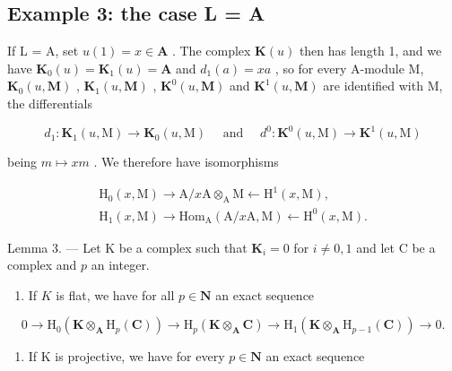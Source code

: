 \subsection{Example 3: the case L = A}

If L = A, set \(u(1) = x \in \mathbf{A}\) . The complex \(\mathbf{K}(u)\) then has length 1, and we have \(\mathbf{K}_{0}(u) = \mathbf{K}_{1}(u) = \mathbf{A}\) and \(d_{1}(a) = xa\) , so for every A-module M, \(\mathbf{K}_{0}(u, \mathbf{M})\) , \(\mathbf{K}_{1}(u, \mathbf{M})\) , \(\mathbf{K}^{0}(u, \mathbf{M})\) and \(\mathbf{K}^{1}(u, \mathbf{M})\) are identified with M, the differentials

\[
d _ {1}: \mathbf {K} _ {1} (u, \mathrm{M}) \rightarrow \mathbf {K} _ {0} (u, \mathrm{M}) \quad \text { and }\quad d ^ {0}: \mathbf {K} ^ {0} (u, \mathrm{M}) \rightarrow \mathbf {K} ^ {1} (u, \mathrm{M})
\]

being \(m \mapsto xm\) . We therefore have isomorphisms

\[
\begin{array}{l} \mathrm{H} _ {0} (x, \mathrm{M}) \to \mathrm{A} / x \mathrm{A} \otimes_ {\mathrm{A}} \mathrm{M} \leftarrow \mathrm{H} ^ {1} (x, \mathrm{M}), \\ \mathrm{H} _ {1} (x, \mathrm{M}) \to \mathrm{Hom} _ {\mathrm{A}} (\mathrm{A} / x \mathrm{A}, \mathrm{M}) \leftarrow \mathrm{H} ^ {0} (x, \mathrm{M}). \end{array}
\]

Lemma 3. --- Let K be a complex such that \(\mathbf{K}_i = 0\) for \(i \neq 0, 1\) and let C be a complex and \(p\) an integer.

\begin{enumerate}
\def\labelenumi{\alph{enumi})}
\tightlist
\item
  If \(K\) is flat, we have for all \(p \in \mathbf{N}\) an exact sequence
\end{enumerate}

\[
0 \rightarrow \mathrm{H} _ {0} (\mathbf {K} \otimes_ {\mathbf {A}} \mathrm{H} _ {p} (\mathbf {C})) \rightarrow \mathrm{H} _ {p} (\mathbf {K} \otimes_ {\mathbf {A}} \mathbf {C}) \rightarrow \mathrm{H} _ {1} (\mathbf {K} \otimes_ {\mathbf {A}} \mathrm{H} _ {p - 1} (\mathbf {C})) \rightarrow 0.
\]

\begin{enumerate}
\def\labelenumi{\alph{enumi})}
\setcounter{enumi}{1}
\tightlist
\item
  If K is projective, we have for every \(p \in \mathbf{N}\) an exact sequence
\end{enumerate}

